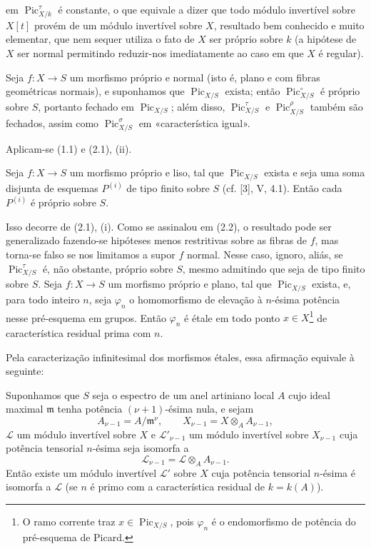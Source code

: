 em $\operatorname{Pic}_{X/k}^\tau$ é constante, o que equivale a dizer que todo
módulo invertível sobre $X[t]$ provém de um módulo invertível sobre $X$, resultado bem conhecido e
muito elementar, que nem sequer utiliza o fato de $X$ ser próprio sobre $k$ (a
hipótese de $X$ ser normal permitindo reduzir-nos imediatamente ao caso em que
$X$ é regular).

 Seja $f:X\longrightarrow S$ um morfismo próprio e
normal (isto é, plano e com fibras geométricas normais), e suponhamos que
$\operatorname{Pic}_{X/S}$ exista; então $\operatorname{Pic}_{X/S}^\circ$ é
próprio sobre $S$, portanto fechado em $\operatorname{Pic}_{X/S}$; além disso,
$\operatorname{Pic}_{X/S}^\tau$ e $\operatorname{Pic}_{X/S}^\rho$ também são
fechados, assim como $\operatorname{Pic}_{X/S}^\sigma$ em «característica
igual».

Aplicam-se (1.1) e (2.1), (ii).

 Seja $f:X\longrightarrow S$ um morfismo próprio e liso,
tal que $\operatorname{Pic}_{X/S}$ exista e seja uma soma disjunta de esquemas
$P^{(i)}$ de tipo finito sobre $S$ (cf. [3], V, 4.1). Então cada $P^{(i)}$ é
próprio sobre $S$.

Isso decorre de (2.1), (i). Como se assinalou em (2.2), o resultado pode ser
generalizado fazendo-se hipóteses menos restritivas sobre as fibras de $f$, mas
torna-se falso se nos limitamos a supor $f$ normal. Nesse caso, ignoro, aliás,
se $\operatorname{Pic}_{X/S}^\tau$ é, não obstante, próprio sobre $S$, mesmo
admitindo que seja de tipo finito sobre $S$.
 Seja $f:X\longrightarrow S$ um morfismo próprio e plano,
tal que $\operatorname{Pic}_{X/S}$ exista, e, para todo inteiro $n$, seja
$\varphi_n$ o homomorfismo de elevação à $n$-ésima potência nesse pré-esquema
em grupos. Então $\varphi_n$ é étale em todo ponto
$x\in X$\footnote{O ramo corrente traz $x\in\operatorname{Pic}_{X/S}$, pois
$\varphi_n$ é o endomorfismo de potência do pré-esquema de Picard.} de
característica residual prima com $n$.

Pela caracterização infinitesimal dos morfismos étales, essa afirmação equivale
à seguinte:

 Suponhamos que $S$ seja o espectro de um anel artiniano local
$A$ cujo ideal maximal $\mathfrak m$ tenha potência $(\nu+1)$-ésima nula, e
sejam
\[
A_{\nu-1}=A/\mathfrak m^\nu,
\qquad X_{\nu-1}=X\otimes_A A_{\nu-1},
\]
$\mathcal L$ um módulo invertível sobre $X$ e $\mathcal L'_{\nu-1}$ um módulo
invertível sobre $X_{\nu-1}$ cuja potência tensorial $n$-ésima seja isomorfa a
\[
\mathcal L_{\nu-1}=\mathcal L\otimes_A A_{\nu-1}.
\]
Então existe um módulo invertível $\mathcal L'$ sobre $X$ cuja potência
tensorial $n$-ésima é isomorfa a $\mathcal L$ (se $n$ é primo com a
característica residual de $k=k(A)$).


